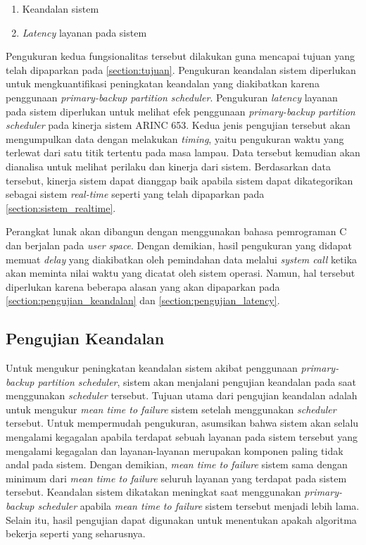 \begin{enumerate}
	\item Keandalan sistem
	\item \textit{Latency} layanan pada sistem
\end{enumerate}

Pengukuran kedua fungsionalitas tersebut dilakukan guna mencapai tujuan yang telah dipaparkan
pada \autoref{section:tujuan}. Pengukuran keandalan sistem diperlukan untuk mengkuantifikasi
peningkatan keandalan yang diakibatkan karena penggunaan \textit{primary-backup partition
scheduler}.  Pengukuran \textit{latency} layanan pada sistem diperlukan untuk melihat efek
penggunaan \textit{primary-backup partition scheduler} pada kinerja sistem ARINC 653. Kedua
jenis pengujian tersebut akan mengumpulkan data dengan melakukan \textit{timing}, yaitu
pengukuran waktu yang terlewat dari satu titik tertentu pada masa lampau. Data tersebut kemudian
akan dianalisa untuk melihat perilaku dan kinerja dari sistem. Berdasarkan data tersebut,
kinerja sistem dapat dianggap baik apabila sistem dapat dikategorikan sebagai sistem
\textit{real-time} seperti yang telah dipaparkan pada \autoref{section:sistem_realtime}.

Perangkat lunak akan dibangun dengan menggunakan bahasa pemrograman C dan berjalan pada
\textit{user space}. Dengan demikian, hasil pengukuran yang didapat memuat \textit{delay} yang
diakibatkan oleh pemindahan data melalui \textit{system call} ketika akan meminta nilai waktu
yang dicatat oleh sistem operasi. Namun, hal tersebut diperlukan karena beberapa alasan yang
akan dipaparkan pada \autoref{section:pengujian_keandalan} dan
\autoref{section:pengujian_latency}.

\subsection{Pengujian Keandalan}
\label{section:pengujian_keandalan}
Untuk mengukur peningkatan keandalan sistem akibat penggunaan \textit{primary-backup partition
scheduler}, sistem akan menjalani pengujian keandalan pada saat menggunakan \textit{scheduler}
tersebut.  Tujuan utama dari pengujian keandalan adalah untuk mengukur \textit{mean time to
failure} sistem setelah menggunakan \textit{scheduler} tersebut. Untuk mempermudah pengukuran,
asumsikan bahwa sistem akan selalu mengalami kegagalan apabila terdapat sebuah layanan pada
sistem tersebut yang mengalami kegagalan dan layanan-layanan merupakan komponen paling tidak
andal pada sistem. Dengan demikian, \textit{mean time to failure} sistem sama dengan minimum
dari \textit{mean time to failure} seluruh layanan yang terdapat pada sistem tersebut. Keandalan
sistem dikatakan meningkat saat menggunakan \textit{primary-backup scheduler} apabila
\textit{mean time to failure} sistem tersebut menjadi lebih lama. Selain itu, hasil pengujian
dapat digunakan untuk menentukan apakah algoritma bekerja seperti yang seharusnya.


